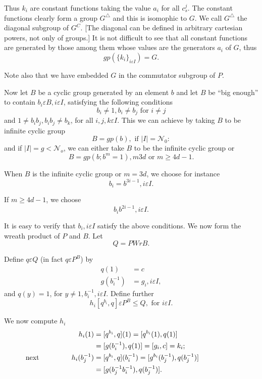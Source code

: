 Thus $k_i$ are constant functions taking the value $a_i$ for all
$c^j_s$. The constant functions clearly form a group $G^\triangle$ and
this is isomophic to $G$. We call $G^\triangle$ the diagonal subgroup
of $G^C$. [The diagonal can be defined in arbitrary cartesian powers,
  not only of groups.] It is not difficult to see that all constant
functions are generated by those among them whose values are the
generators $a_i$ of $G$, thus 
$$
gp (\{k_i\}_{i \varepsilon I}) = G.
$$

Note also that we have embedded $G$ in the commutator subgroup of $P$.

Now let $B$ be a cyclic group generated by an element $b$ and let $B$
be ``big enough'' to contain $b_i \varepsilon B, i \varepsilon I$,
satisfying the following conditions 
$$
b_i \neq 1, b_i \neq b_j \text { for } i \neq j 
$$
and $1 \neq b_i b_j, b_i b_j \neq b_k$, for all $i,j,k \varepsilon
I$. This we can achieve by taking $B$ to be infinite cyclic group 
 $$
 B = gp (b), \text { if } |I| = \mathscr{N}_0 :
 $$
  and if $|I| = g < \mathscr{N}_o$, we can either take $B$ to be the
  infinite cyclic group or 
 $$
 B = gp (b; b^m = 1), m 3d \text { or } m \ge 4d-1.
 $$
 
 When $B$ is the infinite cyclic group or $m = 3d$, we choose for instance
 $$
 b_i = b^{3i-1}, i \varepsilon I.
 $$
 
 If $m  \ge 4d-1$, we choose
  $$
 b_i b^{2i-1}, i \varepsilon I.
$$

It is easy to verify that $b_i, i \varepsilon I$ satisfy the above
conditions. We now form the wreath product of $P$ and $B$. Let 
$$
Q = P Wr B.
$$

Define $q \varepsilon Q$ (in fact $q \varepsilon P^B$) by
\begin{align*}
  q (1) &= c\\
  g (b_i^{-1}) & = g_i, i \varepsilon I,
\end{align*}
and $q (y) = 1$, for $y \neq 1, b_i^{-1}, i \varepsilon I$. Define further
$$
h_i [q^{b_i}, q] \varepsilon P^B \le  Q, \text { for } i \varepsilon I.
$$

We now compute $h_i$
\begin{align*}
  h_i (1) &= [q^{b_i}, q] (1) = [q^{b_i} (1), q(1)]\\
  &= [g (b^{-1}_i), q(1)] = [g_i, c]= k_i;\\
  \text{ next } \hspace{1.5cm} h_i (b^{-1}_j) & = [q^{b_i}, q] (b_i^{-1})
  = [g^{b_i} (b^{-1}_j), q (b^{-1}_j)]\hspace{2cm}\\ 
  & = [g (b_j^{-1} b_i^{-1}), q(b_j^{-1})].
\end{align*}

